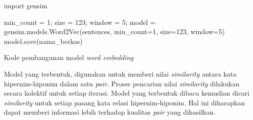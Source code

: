 \begin{kode}

  import gensim\;
  \BlankLine

  min\_count = 1; 
  size = 123;     
  window = 5;     
  model = gensim.models.Word2Vec(sentences, min\_count=1, size=123, window=5)\;
  model.save(nama\_berkas)\;
  
  \caption{Kode pembangunan model \textit{word embedding}}
  \label{code:model-we}
\end{kode}

Model yang terbentuk, digunakan untuk memberi nilai \textit{similarity} antara kata hipernim-hiponim dalam satu \textit{pair}. Proses pencarian nilai \textit{similarity} dilakukan secara kolektif untuk setiap iterasi. Model yang terbentuk dibaca kemudian dicari \textit{similarity} untuk setiap pasang kata relasi hipernim-hiponim. Hal ini diharapkan dapat memberi informasi lebih terhadap kualitas \textit{pair} yang dihasilkan.
